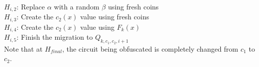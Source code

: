 \noindent $H_{i,2}$: Replace $\alpha$ with a random $\beta$ using fresh coins\\
\noindent $H_{i,3}$: Create the $c_2(x)$ value using fresh coins\\
\noindent $H_{i,4}$: Create the $c_2(x)$ value using $F_k(x)$\\
\noindent $H_{i,5}$: Finish the migration to $Q_{k,c_1,c_2,i+1}$\\

Note that at $H_{final}$, the circuit being obfuscated is completely changed from $c_1$ to $c_2$.




